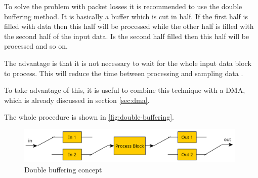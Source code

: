 To solve the problem with packet losses it is recommended to use the double buffering method.
It is basically a buffer which is cut in half. If the first half is filled with data then this half
will be processed while the other half is filled with the second half of the input data. Is the second
half filled then this half will be processed and so on.

The advantage is that it is not necessary to wait for the whole input data block to process.
This will reduce the time between processing and sampling data \cite{eetimes_fund_dsp}.

To take advantage of this, it is useful to combine this technique with a \ac{DMA},
which is already discussed in section \ref{sec:dma}.

The whole procedure is shown in \autoref{fig:double-buffering}.

\begin{figure}[!h]
    \centering
    \includegraphics[width=11cm]{img/double_buffering.PNG}
    \caption{Double buffering concept \cite{eetimes_fund_dsp}}
    \label{fig:double-buffering}
\end{figure}
